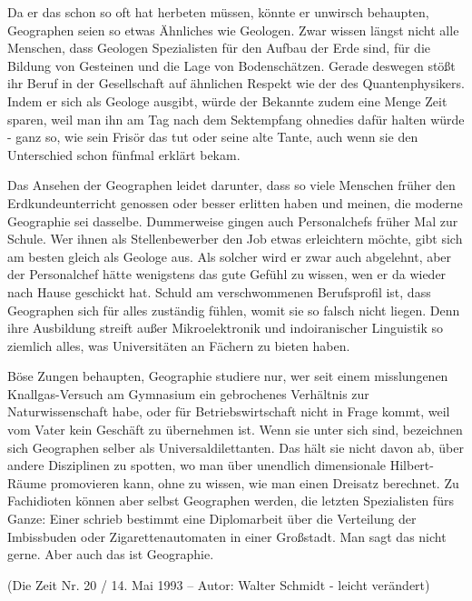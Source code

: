 Da er das schon so oft hat herbeten müssen, könnte er unwirsch behaupten, Geographen seien so etwas Ähnliches wie Geologen. Zwar wissen längst nicht alle Menschen, dass Geologen Spezialisten für den Aufbau der Erde sind, für die Bildung von Gesteinen und die Lage von Bodenschätzen. Gerade deswegen stößt ihr Beruf in der Gesellschaft auf ähnlichen Respekt wie der des Quantenphysikers. Indem er sich als Geologe ausgibt, würde der Bekannte zudem eine Menge Zeit sparen, weil man ihn am Tag nach dem Sektempfang ohnedies dafür halten würde - ganz so, wie sein Frisör das tut oder seine alte Tante, auch wenn sie den Unterschied schon fünfmal erklärt bekam.

Das Ansehen der Geographen leidet darunter, dass so viele Menschen früher den Erdkundeunterricht genossen oder besser erlitten haben und meinen, die moderne Geographie sei dasselbe. Dummerweise gingen auch Personalchefs früher Mal zur Schule. Wer ihnen als Stellenbewerber den Job etwas erleichtern möchte, gibt sich am besten gleich als Geologe aus. Als solcher wird er zwar auch abgelehnt, aber der Personalchef hätte wenigstens das gute Gefühl zu wissen, wen er da wieder nach Hause geschickt hat. Schuld am verschwommenen Berufsproﬁl ist, dass Geographen sich für alles zuständig fühlen, womit sie so falsch nicht liegen. Denn ihre Ausbildung streift außer Mikroelektronik und indoiranischer Linguistik so ziemlich alles, was Universitäten an Fächern zu bieten haben.

Böse Zungen behaupten, Geographie studiere nur, wer seit einem misslungenen Knallgas-Versuch am Gymnasium ein gebrochenes Verhältnis zur Naturwissenschaft habe, oder für Betriebswirtschaft nicht in Frage kommt, weil vom Vater kein Geschäft zu übernehmen ist. Wenn sie unter sich sind, bezeichnen sich Geographen selber als Universaldilettanten. Das hält sie nicht davon ab, über andere Disziplinen zu spotten, wo man über unendlich dimensionale Hilbert-Räume promovieren kann, ohne zu wissen, wie man einen Dreisatz berechnet. Zu Fachidioten können aber selbst Geographen werden, die letzten Spezialisten fürs Ganze: Einer schrieb bestimmt eine Diplomarbeit über die Verteilung der Imbissbuden oder Zigarettenautomaten in einer Großstadt. Man sagt das nicht gerne. Aber auch das ist Geographie. 

(Die Zeit Nr. 20 / 14. Mai 1993 – Autor: Walter Schmidt - leicht verändert)

